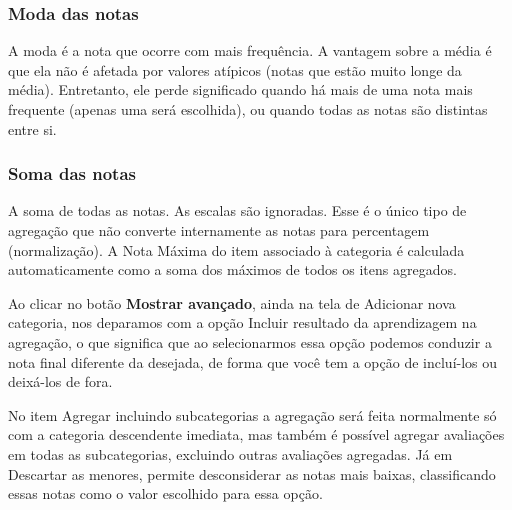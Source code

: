 \subsubsection{Moda das notas}
A moda é a nota que ocorre com mais frequência. A vantagem sobre a média é que ela não é afetada por valores atípicos (notas que estão muito longe da média). Entretanto, ele perde significado quando há mais de uma nota mais frequente (apenas uma será escolhida), ou quando todas as notas são distintas entre si.

\begin{figure}[htbp]
 \begin{center}
  \label{fig:cap6_11}
 \end{center}
\end{figure}

\subsubsection{Soma das notas}
A soma de todas as notas. As escalas são ignoradas. Esse é o único tipo de agregação que não converte internamente as notas para percentagem (normalização). A Nota Máxima do item associado à categoria é calculada automaticamente como a soma dos máximos de todos os itens agregados.

\begin{figure}[htbp]
 \begin{center}
  \label{fig:cap6_12}
 \end{center}
\end{figure}

Ao clicar no botão \textbf{Mostrar avançado}, ainda na tela de Adicionar nova categoria, nos deparamos com a opção Incluir resultado da aprendizagem na agregação, o que significa que ao selecionarmos essa opção podemos conduzir a nota final diferente da desejada, de forma que você tem a opção de incluí-los ou deixá-los de fora.

No item Agregar incluindo subcategorias a agregação será feita normalmente só com a categoria descendente imediata, mas também é possível agregar avaliações em todas as subcategorias, excluindo outras avaliações agregadas. Já em Descartar as menores, permite desconsiderar as notas mais baixas, classificando essas notas como o valor escolhido para essa opção.

